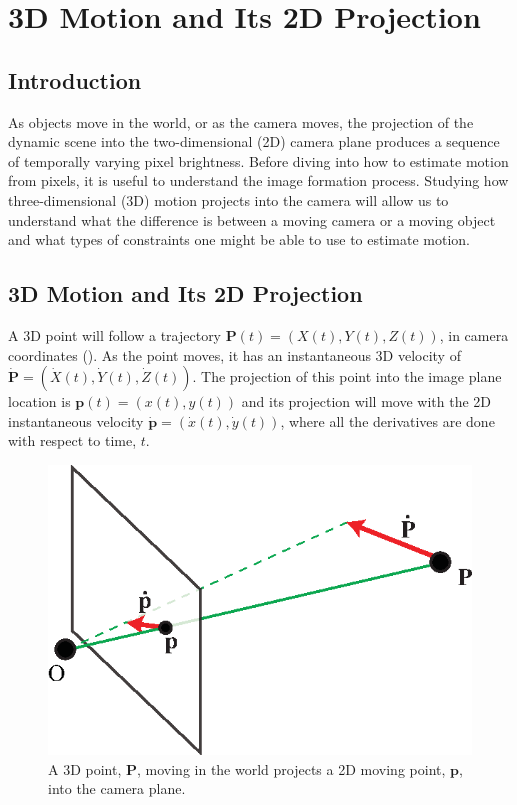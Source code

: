 \chapter{3D Motion and Its 2D Projection}
\label{chapter:3D_motion_and_its_2D_projection}



\section{Introduction}

As objects move in the world, or as the camera moves, the projection of the dynamic scene into the two-dimensional (2D) camera plane produces a sequence of temporally varying pixel brightness. Before diving into how to estimate motion from pixels, it is useful to understand the image formation process. Studying how three-dimensional (3D) motion projects into the camera will allow us to understand what the difference is between a moving camera or a moving object and what types of constraints one might be able to use to estimate motion.


\section{3D Motion and Its 2D Projection}

A 3D point will follow a trajectory $\mathbf{P}(t) = (X(t),Y(t),Z(t))$, in  camera coordinates (\fig{\ref{fig:optical_flow_basic_motion_point}}). As the point moves, it has an instantaneous 3D velocity of $\dot{\mathbf{P}} = (\dot{X}(t), \dot{Y}(t), \dot{Z}(t))$. The projection of this point into the image plane location is $\mathbf{p}(t) = (x(t),y(t))$ and its projection will move with the 2D instantaneous velocity $\dot{\mathbf{p}} = (\dot{x}(t), \dot{y}(t))$, where all the derivatives are done with respect to time, $t$.

\vspace{-.2in}
\begin{figure}[h!]
    \centerline{
        \includegraphics[width=.5\linewidth]{figures/optical_flow/basic_motion_point.eps}
    }
    \caption{A 3D point, $\mathbf{P}$, moving in the world projects a 2D moving point, $\mathbf{p}$, into the camera plane.}
    \label{fig:optical_flow_basic_motion_point}
\end{figure}
\vspace{-.2in}

